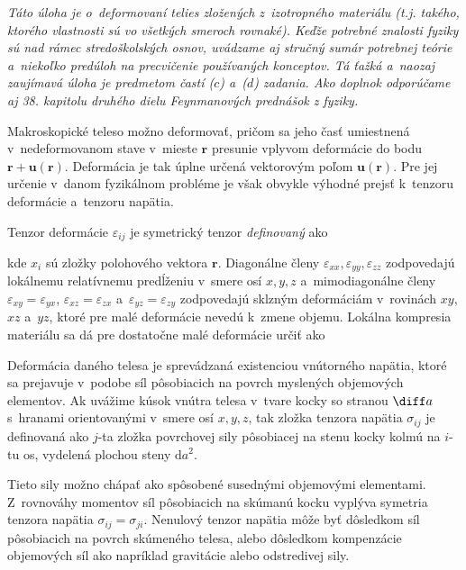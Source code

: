 \emph{Táto úloha je o~deformovaní telies zložených z~izotropného materiálu (t.j. takého, ktorého vlastnosti sú
vo všetkých smeroch rovnaké). Keďže potrebné znalosti fyziky sú nad rámec stredoškolských osnov,
uvádzame aj stručný sumár potrebnej teórie a~niekoľko predúloh na precvičenie používaných konceptov.
Tá ťažká a~naozaj zaujímavá úloha je predmetom častí ($c$) a~($d$) zadania.
Ako doplnok odporúčame aj 38. kapitolu druhého dielu Feynmanových prednášok z fyziky.}

Makroskopické teleso možno deformovať, pričom sa jeho časť umiestnená v~nedeformovanom stave v~mieste
$\mathbf{r}$ presunie vplyvom deformácie do bodu $\mathbf{r}+\mathbf{u}(\mathbf{r})$.
Deformácia je tak úplne určená vektorovým poľom $\mathbf{u}(\mathbf{r})$. Pre jej určenie
v~danom fyzikálnom probléme je však obvykle výhodné prejsť k~tenzoru deformácie a~tenzoru napätia.

Tenzor deformácie $\varepsilon_{ij}$ je symetrický tenzor \emph{definovaný} ako


kde $x_i$ sú zložky polohového vektora $\mathbf{r}$.
Diagonálne členy $\varepsilon_{xx},\varepsilon_{yy},\varepsilon_{zz}$ zodpovedajú lokálnemu relatívnemu
predĺženiu v~smere osí $x, y, z$ a~mimodiagonálne členy $\varepsilon_{xy}=\varepsilon_{yx}$,
$\varepsilon_{xz}=\varepsilon_{zx}$ a~$\varepsilon_{yz}=\varepsilon_{zy}$ zodpovedajú sklzným deformáciám
v~rovinách $xy$, $xz$ a~$yz$, ktoré pre malé deformácie nevedú k~zmene objemu.
Lokálna kompresia materiálu sa dá pre dostatočne malé deformácie určiť ako 


Deformácia daného telesa je sprevádzaná existenciou vnútorného napätia, ktoré sa prejavuje v~podobe síl
pôsobiacich na povrch myslených objemových elementov. Ak uvážime kúsok vnútra telesa v~tvare kocky
so stranou $\diff a$ s~hranami orientovanými v~smere osí $x,y,z$, tak zložka tenzora napätia
$\sigma_{ij}$ je definovaná ako $j$-ta zložka povrchovej sily pôsobiacej na stenu kocky kolmú na $i$-tu os,
vydelená plochou steny $\mathrm{d} a^2$.

Tieto sily možno chápať ako spôsobené susednými objemovými elementami.
Z~rovnováhy momentov síl pôsobiacich na skúmanú kocku vyplýva symetria tenzora napätia $\sigma_{ij} = \sigma_{ji}$.
Nenulový tenzor napätia môže byť dôsledkom síl pôsobiacich na povrch skúmeného telesa,
alebo dôsledkom kompenzácie objemových síl ako napríklad gravitácie alebo odstredivej sily.

